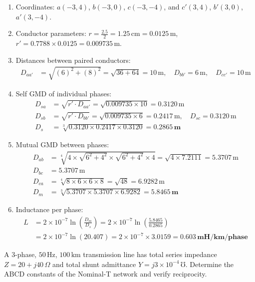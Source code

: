 \documentclass[11pt,a4paper]{article}
\newenvironment{Problem}[1][Numerical Problem]{\begin{tcolorbox}[problembox, title=#1]}{\end{tcolorbox}}
\newenvironment{Solution}[1][Step-by-Step Solution]{\begin{tcolorbox}[solbox, title=#1]}{\end{tcolorbox}}
\begin{document}
\begin{Solution}
\begin{enumerate}
  \item Coordinates: $a(-3, 4)$, $b(-3, 0)$, $c(-3, -4)$, and $c'(3, 4)$, $b'(3, 0)$, $a'(3, -4)$.
  \item Conductor parameters: $r = \frac{2.5}{2} = 1.25\,\text{cm} = 0.0125\,\text{m}$, $r' = 0.7788 \times 0.0125 = 0.009735\,\text{m}$.
  \item Distances between paired conductors:
    \begin{align*}
      D_{aa'} &= \sqrt{(6)^2 + (8)^2} = \sqrt{36 + 64} = 10\,\text{m}, \quad D_{bb'} = 6\,\text{m}, \quad D_{cc'} = 10\,\text{m}
    \end{align*}
  \item Self GMD of individual phases:
    \begin{align*}
      D_{sa} &= \sqrt{r' \cdot D_{aa'}} = \sqrt{0.009735 \times 10} = 0.3120\,\text{m} \\
      D_{sb} &= \sqrt{r' \cdot D_{bb'}} = \sqrt{0.009735 \times 6} = 0.2417\,\text{m}, \quad D_{sc} = 0.3120\,\text{m} \\
      D_s &= \sqrt[3]{0.3120 \times 0.2417 \times 0.3120} = \mathbf{0.2865\,\text{m}}
    \end{align*}
  \item Mutual GMD between phases:
    \begin{align*}
      D_{ab} &= \sqrt[4]{4 \times \sqrt{6^2 + 4^2} \times \sqrt{6^2 + 4^2} \times 4} = \sqrt{4 \times 7.2111} = 5.3707\,\text{m} \\
      D_{bc} &= 5.3707\,\text{m} \\
      D_{ca} &= \sqrt[4]{8 \times 6 \times 6 \times 8} = \sqrt{48} = 6.9282\,\text{m} \\
      D_m &= \sqrt[3]{5.3707 \times 5.3707 \times 6.9282} = \mathbf{5.8465\,\text{m}}
    \end{align*}
  \item Inductance per phase:
    \begin{align*}
      L &= 2 \times 10^{-7} \ln\left(\frac{D_m}{D_s}\right) = 2 \times 10^{-7} \ln\left(\frac{5.8465}{0.2865}\right) \\
        &= 2 \times 10^{-7} \ln(20.407) = 2 \times 10^{-7} \times 3.0159 = \mathbf{0.603\,\text{mH/km/phase}}
    \end{align*}
\end{enumerate}
\end{Solution}

\begin{Problem}[Problem 4: ABCD Parameters of a Medium Nominal-T Transmission Line]
A 3-phase, $50\,\text{Hz}$, $100\,\text{km}$ transmission line has total series impedance $Z = 20 + j40\,\Omega$ and total shunt admittance $Y = j 3 \times 10^{-4}\,\mho$. Determine the ABCD constants of the Nominal-T network and verify reciprocity.
\end{Problem}
\end{document}

